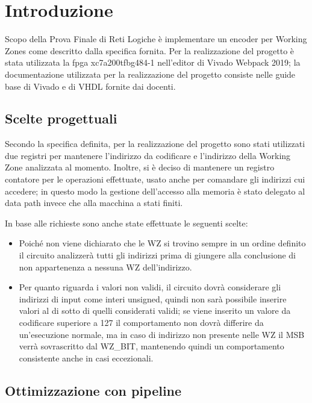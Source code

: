 
\section{Introduzione}

Scopo della Prova Finale di Reti Logiche \`e implementare un encoder per Working Zones come descritto dalla specifica fornita. Per la realizzazione del progetto \`e stata utilizzata la fpga xc7a200tfbg484-1 nell'editor di Vivado Webpack 2019; la documentazione utilizzata per la realizzazione del progetto consiste nelle guide base di Vivado e di VHDL fornite dai docenti.

\subsection{Scelte progettuali}

Secondo la specifica definita, per la realizzazione del progetto sono stati utilizzati due registri per mantenere l'indirizzo da codificare e l'indirizzo della Working Zone analizzata al momento. Inoltre, si \`e deciso di mantenere un registro contatore per le operazioni effettuate, usato anche per comandare gli indirizzi cui accedere; in questo modo la gestione dell'accesso alla memoria \`e stato delegato al data path invece che alla macchina a stati finiti.

In base alle richieste sono anche state effettuate le seguenti scelte:
\begin{itemize}	
	\item Poich\'e non viene dichiarato che le WZ si trovino sempre in un ordine definito il circuito analizzer\`a tutti gli indirizzi prima di giungere alla conclusione di non appartenenza a nessuna WZ dell'indirizzo.
	
	\label{eccezione}\item Per quanto riguarda i valori non validi, il circuito dovr\`a considerare gli indirizzi di input come interi unsigned, quindi non sar\`a possibile inserire valori al di sotto di quelli considerati validi; se viene inserito un valore da codificare superiore a 127 il comportamento non dovr\`a differire da un'esecuzione normale, ma in caso di indirizzo non presente nelle WZ il MSB verr\`a sovrascritto dal WZ\_BIT, mantenendo quindi un comportamento consistente anche in casi eccezionali.
\end{itemize}

\subsection{Ottimizzazione con pipeline}

